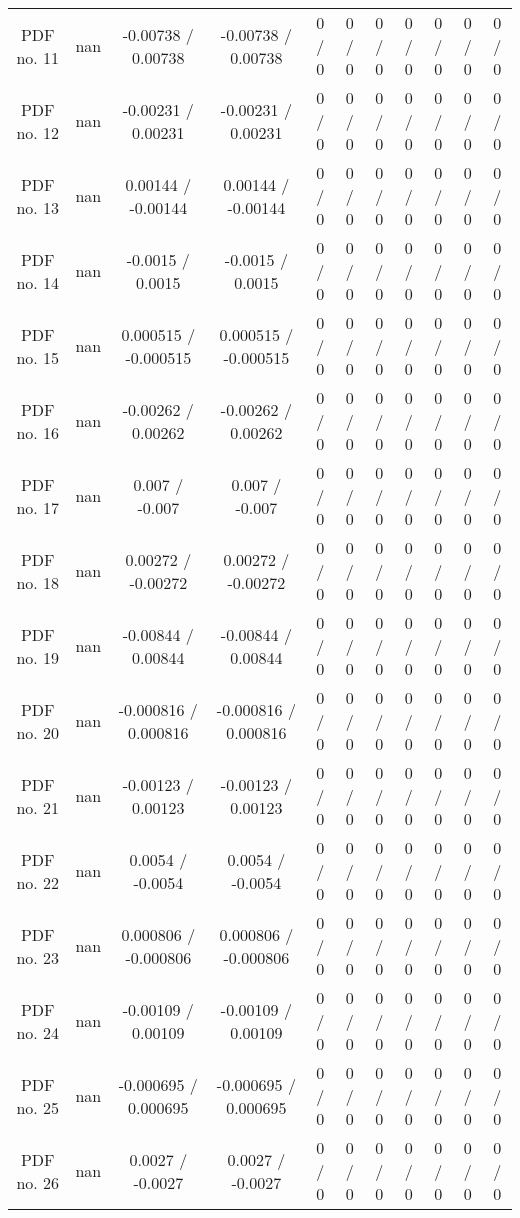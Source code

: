 \begin{table}[htbp]
\begin{center}
\begin{tabular}{|c|c|c|c|c|c|c|c|c|c|c|}
  PDF no. 11 &    nan    & -0.00738 / 0.00738 & -0.00738 / 0.00738 & 0 / 0 & 0 / 0 & 0 / 0 & 0 / 0 & 0 / 0 & 0 / 0 & 0 / 0 \\ 
  PDF no. 12 &    nan    & -0.00231 / 0.00231 & -0.00231 / 0.00231 & 0 / 0 & 0 / 0 & 0 / 0 & 0 / 0 & 0 / 0 & 0 / 0 & 0 / 0 \\ 
  PDF no. 13 &    nan    & 0.00144 / -0.00144 & 0.00144 / -0.00144 & 0 / 0 & 0 / 0 & 0 / 0 & 0 / 0 & 0 / 0 & 0 / 0 & 0 / 0 \\ 
  PDF no. 14 &    nan    & -0.0015 / 0.0015 & -0.0015 / 0.0015 & 0 / 0 & 0 / 0 & 0 / 0 & 0 / 0 & 0 / 0 & 0 / 0 & 0 / 0 \\ 
  PDF no. 15 &    nan    & 0.000515 / -0.000515 & 0.000515 / -0.000515 & 0 / 0 & 0 / 0 & 0 / 0 & 0 / 0 & 0 / 0 & 0 / 0 & 0 / 0 \\ 
  PDF no. 16 &    nan    & -0.00262 / 0.00262 & -0.00262 / 0.00262 & 0 / 0 & 0 / 0 & 0 / 0 & 0 / 0 & 0 / 0 & 0 / 0 & 0 / 0 \\ 
  PDF no. 17 &    nan    & 0.007 / -0.007 & 0.007 / -0.007 & 0 / 0 & 0 / 0 & 0 / 0 & 0 / 0 & 0 / 0 & 0 / 0 & 0 / 0 \\ 
  PDF no. 18 &    nan    & 0.00272 / -0.00272 & 0.00272 / -0.00272 & 0 / 0 & 0 / 0 & 0 / 0 & 0 / 0 & 0 / 0 & 0 / 0 & 0 / 0 \\ 
  PDF no. 19 &    nan    & -0.00844 / 0.00844 & -0.00844 / 0.00844 & 0 / 0 & 0 / 0 & 0 / 0 & 0 / 0 & 0 / 0 & 0 / 0 & 0 / 0 \\ 
  PDF no. 20 &    nan    & -0.000816 / 0.000816 & -0.000816 / 0.000816 & 0 / 0 & 0 / 0 & 0 / 0 & 0 / 0 & 0 / 0 & 0 / 0 & 0 / 0 \\ 
  PDF no. 21 &    nan    & -0.00123 / 0.00123 & -0.00123 / 0.00123 & 0 / 0 & 0 / 0 & 0 / 0 & 0 / 0 & 0 / 0 & 0 / 0 & 0 / 0 \\ 
  PDF no. 22 &    nan    & 0.0054 / -0.0054 & 0.0054 / -0.0054 & 0 / 0 & 0 / 0 & 0 / 0 & 0 / 0 & 0 / 0 & 0 / 0 & 0 / 0 \\ 
  PDF no. 23 &    nan    & 0.000806 / -0.000806 & 0.000806 / -0.000806 & 0 / 0 & 0 / 0 & 0 / 0 & 0 / 0 & 0 / 0 & 0 / 0 & 0 / 0 \\ 
  PDF no. 24 &    nan    & -0.00109 / 0.00109 & -0.00109 / 0.00109 & 0 / 0 & 0 / 0 & 0 / 0 & 0 / 0 & 0 / 0 & 0 / 0 & 0 / 0 \\ 
  PDF no. 25 &    nan    & -0.000695 / 0.000695 & -0.000695 / 0.000695 & 0 / 0 & 0 / 0 & 0 / 0 & 0 / 0 & 0 / 0 & 0 / 0 & 0 / 0 \\ 
  PDF no. 26 &    nan    & 0.0027 / -0.0027 & 0.0027 / -0.0027 & 0 / 0 & 0 / 0 & 0 / 0 & 0 / 0 & 0 / 0 & 0 / 0 & 0 / 0 \\ 

\end{tabular}
\end{center}
\end{table}

